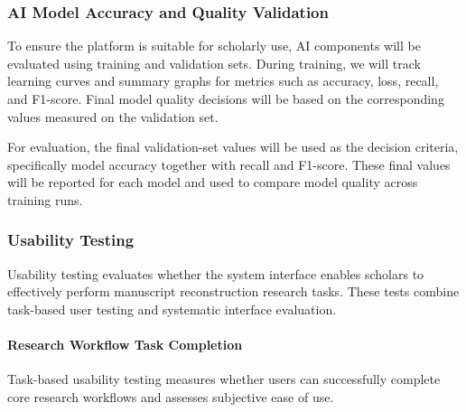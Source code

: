 \documentclass[12pt, titlepage]{article}
\begin{document}
\subsubsection{AI Model Accuracy and Quality Validation}

To ensure the platform is suitable for scholarly use, AI components will be evaluated using training and validation sets. During training, we will track learning curves and summary graphs for metrics such as accuracy, loss, recall, and F1-score. Final model quality decisions will be based on the corresponding values measured on the validation set.

For evaluation, the final validation-set values will be used as the decision criteria, specifically model accuracy together with recall and F1-score. These final values will be reported for each model and used to compare model quality across training runs.

\subsubsection{Usability Testing}

Usability testing evaluates whether the system interface enables scholars to effectively perform manuscript reconstruction research tasks. These tests combine task-based user testing and systematic interface evaluation.

\paragraph{Research Workflow Task Completion}

Task-based usability testing measures whether users can successfully complete core research workflows and assesses subjective ease of use.
\end{document}

